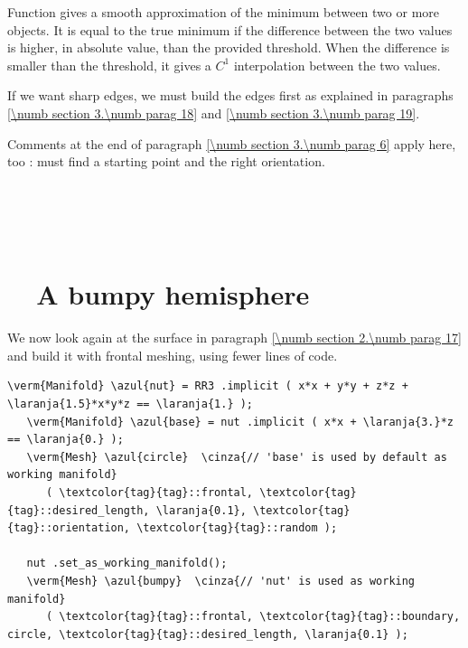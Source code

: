 Function {\small\tt{}} gives a smooth approximation of the minimum between
two or more {\small\tt{}} objects.
It is equal to the true minimum if the difference between the two values is higher, in
absolute value, than the provided threshold.
When the difference is smaller than the threshold, it gives a $ C^1 $ interpolation between
the two values.

If we want sharp edges, we must build the edges first as explained in paragraphs
\ref{\numb section 3.\numb parag 18} and \ref{\numb section 3.\numb parag 19}.

Comments at the end of paragraph \ref{\numb section 3.\numb parag 6} apply here, too :
{\maniFEM} must find a starting point and the right orientation.


\section{~~\cinzasec{[empty]}}\label{\numb section 3.\numb parag 8}


\section{~~A bumpy hemisphere}\label{\numb section 3.\numb parag 9}

We now look again at the surface in paragraph \ref{\numb section 2.\numb parag 17}
and build it with frontal meshing, using fewer lines of code.

\begin{Verbatim}[commandchars=\\\{\},formatcom=\small\tt,frame=single,
   label=parag-\ref{\numb section 3.\numb parag 9}.cpp,rulecolor=\color{moldura},
   baselinestretch=0.94,framesep=2mm                                            ]
   \verm{Manifold} \azul{nut} = RR3 .implicit ( x*x + y*y + z*z + \laranja{1.5}*x*y*z == \laranja{1.} );
   \verm{Manifold} \azul{base} = nut .implicit ( x*x + \laranja{3.}*z == \laranja{0.} );
   \verm{Mesh} \azul{circle}  \cinza{// 'base' is used by default as working manifold}
      ( \textcolor{tag}{tag}::frontal, \textcolor{tag}{tag}::desired_length, \laranja{0.1}, \textcolor{tag}{tag}::orientation, \textcolor{tag}{tag}::random );
   
   nut .set_as_working_manifold();
   \verm{Mesh} \azul{bumpy}  \cinza{// 'nut' is used as working manifold}
      ( \textcolor{tag}{tag}::frontal, \textcolor{tag}{tag}::boundary, circle, \textcolor{tag}{tag}::desired_length, \laranja{0.1} );
\end{Verbatim}

